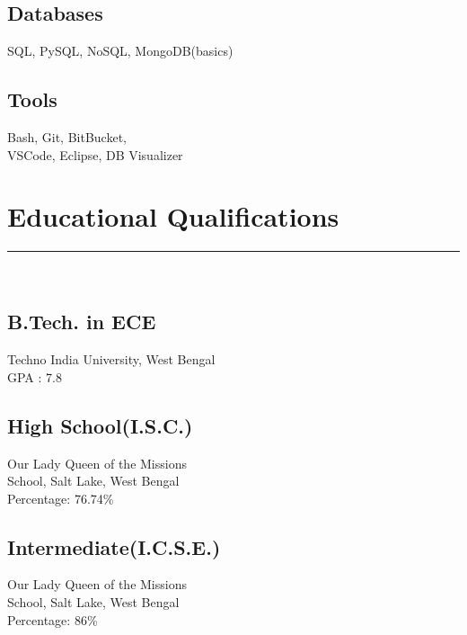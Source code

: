 \documentclass[]{DD_Resume_21}
\begin{document}
\begin{minipage}[t]{0.33\textwidth}
\subsection{Databases}
SQL, PySQL, NoSQL, MongoDB(basics)
\vspace{6pt}
\subsection{Tools}
Bash, Git, BitBucket,\\
VSCode, Eclipse, DB Visualizer
\sectionsep
\section{Educational Qualifications} 
\noindent\rule{5cm}{0.4pt}\\
\subsection{B.Tech. in ECE}
Techno India University, West Bengal \\
GPA : 7.8\\
\vspace{8pt}
\subsection{High School(I.S.C.)}
Our Lady Queen of the Missions\\
School, Salt Lake, West Bengal\\
Percentage: 76.74\%\\
\vspace{8pt}
\subsection{Intermediate(I.C.S.E.)}
Our Lady Queen of the Missions\\
School, Salt Lake, West Bengal\\
Percentage: 86\%
\sectionsep
%
%

\end{minipage} 
\hfill
\end{document}
